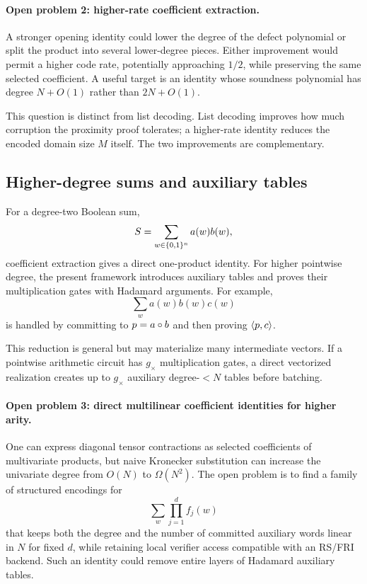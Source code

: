 \paragraph{Open problem 2: higher-rate coefficient extraction.}
A stronger opening identity could lower the degree of the defect polynomial or split the product into several lower-degree pieces.  Either improvement would permit a higher code rate, potentially approaching $1/2$, while preserving the same selected coefficient.  A useful target is an identity whose soundness polynomial has degree $N+O(1)$ rather than $2N+O(1)$.

This question is distinct from list decoding.  List decoding improves how much corruption the proximity proof tolerates; a higher-rate identity reduces the encoded domain size $M$ itself.  The two improvements are complementary.

\subsection{Higher-degree sums and auxiliary tables}
\label{sec:limitations-higher-degree}

For a degree-two Boolean sum,
\[
  S=\sum_{w\in\{0,1\}^n}a(w)b(w),
\]
coefficient extraction gives a direct one-product identity.  For higher pointwise degree, the present framework introduces auxiliary tables and proves their multiplication gates with Hadamard arguments.  For example,
\[
  \sum_w a(w)b(w)c(w)
\]
is handled by committing to $p=a\circ b$ and then proving $\left\langle p,c\right\rangle$.

This reduction is general but may materialize many intermediate vectors.  If a pointwise arithmetic circuit has $g_\times$ multiplication gates, a direct vectorized realization creates up to $g_\times$ auxiliary degree-$<N$ tables before batching.

\paragraph{Open problem 3: direct multilinear coefficient identities for higher arity.}
One can express diagonal tensor contractions as selected coefficients of multivariate products, but naive Kronecker substitution can increase the univariate degree from $O(N)$ to $\Omega(N^2)$.  The open problem is to find a family of structured encodings for
\[
  \sum_w\prod_{j=1}^{d} f_j(w)
\]
that keeps both the degree and the number of committed auxiliary words linear in $N$ for fixed $d$, while retaining local verifier access compatible with an RS/FRI backend.  Such an identity could remove entire layers of Hadamard auxiliary tables.

